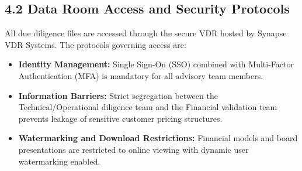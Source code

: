 \subsection{4.2 Data Room Access and Security Protocols}
All due diligence files are accessed through the secure VDR hosted by Synapse VDR Systems. The protocols governing access are:
\begin{itemize}[leftmargin=*]
  \item \textbf{Identity Management:} Single Sign-On (SSO) combined with Multi-Factor Authentication (MFA) is mandatory for all advisory team members.
  \item \textbf{Information Barriers:} Strict segregation between the Technical/Operational diligence team and the Financial validation team prevents leakage of sensitive customer pricing structures.
  \item \textbf{Watermarking and Download Restrictions:} Financial models and board presentations are restricted to online viewing with dynamic user watermarking enabled.
\end{itemize}
